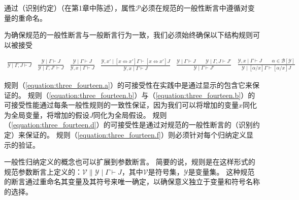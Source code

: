 通过（识别约定）（在第1章中陈述），属性$ \mathcal{P} $必须在规范的一般性断言中遵循对变量的重命名。

为确保规范的一般性断言与一般断言行为一致，我们必须始终确保以下结构规则可以被接受

\begin{subequations}
    \begin{align}
        \frac{}{\mathcal{Y} \mid \Gamma,J \vdash J} \label{equation:three_fourteen.a}
    \end{align}
    \begin{align}
        \frac{\mathcal{Y} \mid \Gamma \vdash J}{\mathcal{Y} \mid \Gamma,J' \vdash J} \label{equation:three_fourteen.b}
    \end{align}
    \begin{align}
        \frac{\mathcal{Y} \mid \Gamma \vdash J}{\mathcal{Y},x \mid \Gamma \vdash J} \label{equation:three_fourteen.c}
    \end{align}
    \begin{align}
        \frac{\mathcal{Y},x' \mid [x \Leftrightarrow x'] \Gamma \vdash [x \Leftrightarrow x'] J}{\mathcal{Y},x \mid  \Gamma \vdash J} \label{equation:three_fourteen.d}
    \end{align}
    \begin{align}
        \frac{\mathcal{Y} \mid \Gamma \vdash J \qquad \mathcal{Y} \mid \Gamma,J \vdash J'}{\mathcal{Y} \mid \Gamma \vdash J'} \label{equation:three_fourteen.e}
    \end{align}
    \begin{align}
        \frac{\mathcal{Y},x \mid \Gamma \vdash J \qquad \alpha \in \mathcal{B}[\mathcal{Y}]}{\mathcal{Y} \mid [\alpha / x] \Gamma \vdash [\alpha / x] J} \label{equation:three_fourteen.f}
    \end{align}
\end{subequations}

规则（\ref{equation:three_fourteen.a}）的可接受性在实践中是通过显示的包含它来保证的。
规则（\ref{equation:three_fourteen.b}）与（\ref{equation:three_fourteen.b}）的可接受性能通过每条一般性规则的一致性保证，因为我们可以将增加的变量$x$同化为全局变量，将增加的假设$J$同化为全局假设。
规则（\ref{equation:three_fourteen.d}）的可接受性是通过对规范的一般性断言的（识别约定）来保证的。
规则（\ref{equation:three_fourteen.f}）则必须针对每个归纳定义显示的验证。

一般性归纳定义的概念也可以扩展到参数断言。
简要的说，规则是在这样形式的规范参数断言上定义的：$\mathcal{V} \parallel \mathcal{Y} \mid \Gamma \vdash J$，其中$\mathcal{V}$是符号集，$\mathcal{Y}$是变量集。
这种规范的断言通过重命名其变量及其符号来唯一确定，以确保意义独立于变量和符号名称的选择。

